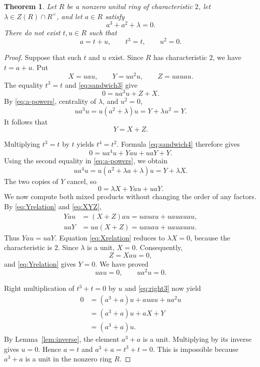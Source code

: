 \documentclass[12pt]{amsart}
\newtheorem{theorem}{Theorem}[section]
\theoremstyle{remark}
\numberwithin{equation}{section}
\theoremstyle{definition}
\begin{document}
\begin{theorem}\label{thm:cubic}
Let $R$ be a nonzero unital ring of characteristic $2$, let $\lambda\in Z(R)\cap R^\times$, and let $a\in R$ satisfy
\begin{equation}
 a^3+a^2+\lambda=0.
\end{equation}
There do not exist $t,u\in R$ such that
\[
 a=t+u,\qquad t^3=t,\qquad u^2=0.
\]
\end{theorem}

\begin{proof}
Suppose that such $t$ and $u$ exist. Since $R$ has characteristic $2$, we have $t=a+u$. Put
\begin{equation}\label{eq:XYZ}
 X=uau,\qquad Y=ua^2u,\qquad Z=uauau.
\end{equation}
The equality $t^3=t$ and \eqref{eq:sandwich3} give
\[
 0=ua^3u+Z+X.
\]
By \eqref{eq:a-powers}, centrality of $\lambda$, and $u^2=0$,
\[
 ua^3u=u(a^2+\lambda)u=Y+\lambda u^2=Y.
\]
It follows that
\begin{equation}\label{eq:Yrelation}
 Y=X+Z.
\end{equation}

Multiplying $t^3=t$ by $t$ yields $t^4=t^2$. Formula \eqref{eq:sandwich4} therefore gives
\[
 0=ua^4u+Yau+uaY+Y.
\]
Using the second equality in \eqref{eq:a-powers}, we obtain
\[
 ua^4u=u(a^2+\lambda a+\lambda)u=Y+\lambda X.
\]
The two copies of $Y$ cancel, so
\begin{equation}\label{eq:Xrelation}
 0=\lambda X+Yau+uaY.
\end{equation}
We now compute both mixed products without changing the order of any factors. By \eqref{eq:Yrelation} and \eqref{eq:XYZ},
\begin{align*}
 Yau&=(X+Z)au=uauau+uauauau,\\
 uaY&=ua(X+Z)=uauau+uauauau.
\end{align*}
Thus $Yau=uaY$. Equation \eqref{eq:Xrelation} reduces to $\lambda X=0$, because the characteristic is $2$. Since $\lambda$ is a unit, $X=0$. Consequently,
\[
 Z=Xau=0,
\]
and \eqref{eq:Yrelation} gives $Y=0$. We have proved
\begin{equation}\label{eq:vanishing}
 uau=0,\qquad ua^2u=0.
\end{equation}

Right multiplication of $t^3+t=0$ by $u$ and \eqref{eq:right3} now yield
\begin{align*}
 0&=(a^3+a)u+auau+ua^2u\\
  &=(a^3+a)u+aX+Y\\
  &=(a^3+a)u.
\end{align*}
By Lemma~\ref{lem:inverse}, the element $a^3+a$ is a unit. Multiplying by its inverse gives $u=0$. Hence $a=t$ and $a^3+a=t^3+t=0$. This is impossible because $a^3+a$ is a unit in the nonzero ring $R$.
\end{proof}
\end{document}
